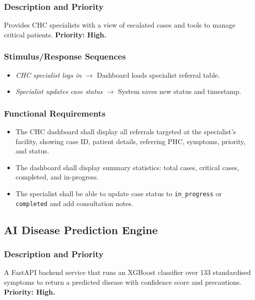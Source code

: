 \documentclass[12pt,a4paper]{article}
\begin{document}
\subsubsection{Description and Priority}
Provides CHC specialists with a view of escalated cases and tools to manage critical patients. \textbf{Priority: High.}

\subsubsection{Stimulus/Response Sequences}
\begin{itemize}
    \item \textit{CHC specialist logs in} $\rightarrow$ Dashboard loads specialist referral table.
    \item \textit{Specialist updates case status} $\rightarrow$ System saves new status and timestamp.
\end{itemize}

\subsubsection{Functional Requirements}
\begin{itemize}
    \item[\texttt{REQ-CHC-01}] The CHC dashboard shall display all referrals targeted at the specialist's facility, showing case ID, patient details, referring PHC, symptoms, priority, and status.
    \item[\texttt{REQ-CHC-02}] The dashboard shall display summary statistics: total cases, critical cases, completed, and in-progress.
    \item[\texttt{REQ-CHC-03}] The specialist shall be able to update case status to \texttt{in\_progress} or \texttt{completed} and add consultation notes.
\end{itemize}

\subsection{AI Disease Prediction Engine}

\subsubsection{Description and Priority}
A FastAPI backend service that runs an XGBoost classifier over 133 standardised symptoms to return a predicted disease with confidence score and precautions. \textbf{Priority: High.}
\end{document}
